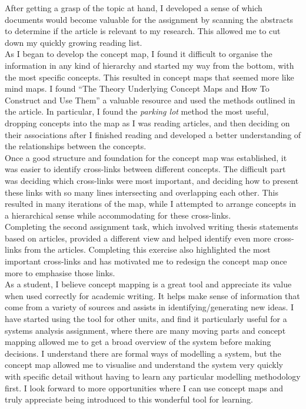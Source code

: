 \documentclass[12pt,a4paper]{report}
\begin{document}
After getting a grasp of the topic at hand, I developed a sense of which documents would become valuable for the assignment by scanning the abstracts to determine if the article is relevant to my research. This allowed me to cut down my quickly growing reading list.\\

As I began to develop the concept map, I found it difficult to organise the information in any kind of hierarchy and started my way from the bottom, with the most specific concepts. This resulted in concept maps that seemed more like mind maps. I found \citet{Novak2006} ``The Theory Underlying Concept Maps and How To Construct and Use Them'' a valuable resource and used the methods outlined in the article. In particular, I found the \emph{parking lot} method the most useful, dropping concepts into the map as I was reading articles, and then deciding on their associations after I finished reading and developed a better understanding of the relationships between the concepts.\\

Once a good structure and foundation for the concept map was established, it was easier to identify cross-links between different concepts. The difficult part was deciding which cross-links were most important, and deciding how to present these links with so many lines intersecting and overlapping each other. This resulted in many iterations of the map, while I attempted to arrange concepts in a hierarchical sense while accommodating for these cross-links.\\

Completing the second assignment task, which involved writing thesis statements based on articles, provided a different view and helped identify even more cross-links from the articles. Completing this exercise also highlighted the most important cross-links and has motivated me to redesign the concept map once more to emphasise those links.\\

As a student, I believe concept mapping is a great tool and appreciate its value when used correctly for academic writing. It helps make sense of information that come from a variety of sources and assists in identifying/generating new ideas. I have started using the tool for other units, and find it particularly useful for a systems analysis assignment, where there are many moving parts and concept mapping allowed me to get a broad overview of the system before making decisions. I understand there are formal ways of modelling a system, but the concept map allowed me to visualise and understand the system very quickly with specific detail without having to learn any particular modelling methodology first. I look forward to more opportunities where I can use concept maps and truly appreciate being introduced to this wonderful tool for learning.

\newpage
{}


\end{document}
